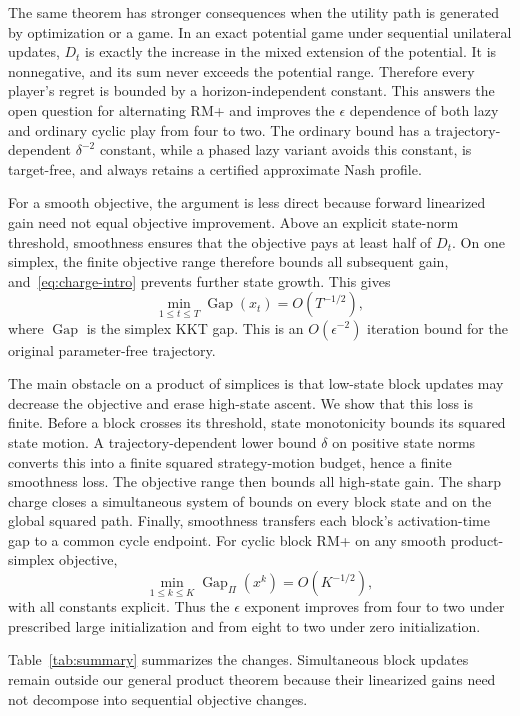 \documentclass{article}
\newcommand{\Gap}{\operatorname{Gap}}
\begin{document}
The same theorem has stronger consequences when the utility path is generated by optimization or a game. In an exact potential game under sequential unilateral updates, $D_t$ is exactly the increase in the mixed extension of the potential. It is nonnegative, and its sum never exceeds the potential range. Therefore every player's regret is bounded by a horizon-independent constant. This answers the open question for alternating RM+ and improves the $\epsilon$ dependence of both lazy and ordinary cyclic play from four to two. The ordinary bound has a trajectory-dependent $\delta^{-2}$ constant, while a phased lazy variant avoids this constant, is target-free, and always retains a certified approximate Nash profile.

For a smooth objective, the argument is less direct because forward linearized gain need not equal objective improvement. Above an explicit state-norm threshold, smoothness ensures that the objective pays at least half of $D_t$. On one simplex, the finite objective range therefore bounds all subsequent gain, and~\eqref{eq:charge-intro} prevents further state growth. This gives
\begin{equation}
\min_{1\le t\le T}\Gap(x_t)=O(T^{-1/2}),
\end{equation}
where $\Gap$ is the simplex KKT gap. This is an $O(\epsilon^{-2})$ iteration bound for the original parameter-free trajectory.

The main obstacle on a product of simplices is that low-state block updates may decrease the objective and erase high-state ascent. We show that this loss is finite. Before a block crosses its threshold, state monotonicity bounds its squared state motion. A trajectory-dependent lower bound $\delta$ on positive state norms converts this into a finite squared strategy-motion budget, hence a finite smoothness loss. The objective range then bounds all high-state gain. The sharp charge closes a simultaneous system of bounds on every block state and on the global squared path. Finally, smoothness transfers each block's activation-time gap to a common cycle endpoint. For cyclic block RM+ on any smooth product-simplex objective,
\begin{equation}
\min_{1\le k\le K}\Gap_\Pi(x^k)=O(K^{-1/2}),
\end{equation}
with all constants explicit. Thus the $\epsilon$ exponent improves from four to two under prescribed large initialization and from eight to two under zero initialization.

Table~\ref{tab:summary} summarizes the changes. Simultaneous block updates remain outside our general product theorem because their linearized gains need not decompose into sequential objective changes.
\end{document}
